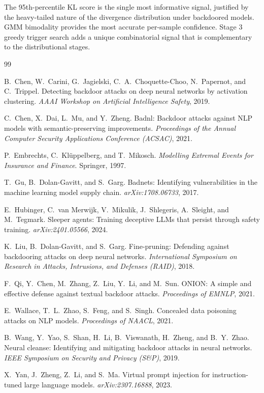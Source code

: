 \documentclass[11pt,a4paper]{article}
\begin{document}
The 95th-percentile KL score is the single most informative signal, justified
by the heavy-tailed nature of the divergence distribution under backdoored
models. GMM bimodality provides the most accurate per-sample confidence. Stage 3
greedy trigger search adds a unique combinatorial signal that is complementary
to the distributional stages.


\begin{thebibliography}{99}

B.\ Chen, W.\ Carini, G.\ Jagielski, C.\ A.\ Choquette-Choo, N.\ Papernot, and C.\ Trippel.
Detecting backdoor attacks on deep neural networks by activation clustering.
\emph{AAAI Workshop on Artificial Intelligence Safety}, 2019.

C.\ Chen, X.\ Dai, L.\ Mu, and Y.\ Zheng.
Badnl: Backdoor attacks against {NLP} models with semantic-preserving improvements.
\emph{Proceedings of the Annual Computer Security Applications Conference (ACSAC)}, 2021.

P.\ Embrechts, C.\ Kl\"uppelberg, and T.\ Mikosch.
\emph{Modelling Extremal Events for Insurance and Finance}.
Springer, 1997.

T.\ Gu, B.\ Dolan-Gavitt, and S.\ Garg.
Badnets: Identifying vulnerabilities in the machine learning model supply chain.
\emph{arXiv:1708.06733}, 2017.

E.\ Hubinger, C.\ van Merwijk, V.\ Mikulik, J.\ Shlegeris, A.\ Sleight, and M.\ Tegmark.
Sleeper agents: Training deceptive {LLMs} that persist through safety training.
\emph{arXiv:2401.05566}, 2024.

K.\ Liu, B.\ Dolan-Gavitt, and S.\ Garg.
Fine-pruning: Defending against backdooring attacks on deep neural networks.
\emph{International Symposium on Research in Attacks, Intrusions, and Defenses (RAID)}, 2018.

F.\ Qi, Y.\ Chen, M.\ Zhang, Z.\ Liu, Y.\ Li, and M.\ Sun.
{ONION}: A simple and effective defense against textual backdoor attacks.
\emph{Proceedings of EMNLP}, 2021.

E.\ Wallace, T.\ L.\ Zhao, S.\ Feng, and S.\ Singh.
Concealed data poisoning attacks on {NLP} models.
\emph{Proceedings of NAACL}, 2021.

B.\ Wang, Y.\ Yao, S.\ Shan, H.\ Li, B.\ Viswanath, H.\ Zheng, and B.\ Y.\ Zhao.
Neural cleanse: Identifying and mitigating backdoor attacks in neural networks.
\emph{IEEE Symposium on Security and Privacy (S\&P)}, 2019.

X.\ Yan, J.\ Zheng, Z.\ Li, and S.\ Ma.
Virtual prompt injection for instruction-tuned large language models.
\emph{arXiv:2307.16888}, 2023.

\end{thebibliography}
\end{document}
